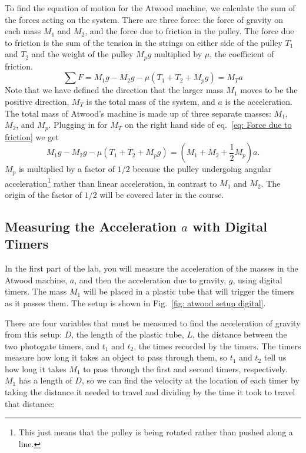 \documentclass[addpoints]{physlabs}
\begin{document}
\begin{labsection}
\begin{theory}
To find the equation of motion for the Atwood machine, we calculate the sum of the forces acting on the system. There are three force: the force of gravity on each mass $M_1$ and $M_2$, and the force due to friction in the pulley. The force due to friction is the sum of the tension in the strings on either side of the pulley $T_1$ and $T_2$ and the weight of the pulley $M_pg$ multiplied by $\mu$, the coefficient of friction.
%
\begin{equation}\label{eq: Force due to friction}
    \sum F = M_1g - M_2g - \mu(T_1 + T_2 + M_pg) = M_Ta
\end{equation}
%
Note that we have defined the direction that the larger mass $M_1$ moves to be the positive direction, $M_T$ is the total mass of the system, and $a$ is the acceleration. The total mass of Atwood's machine is made up of three separate masses: $M_1$, $M_2$, and $M_p$. Plugging in for $M_T$ on the right hand side of eq.~\ref{eq: Force due to friction} we get
%
\begin{equation}\label{eq: Force}
    M_1g - M_2g - \mu(T_1 + T_2 + M_pg) = (M_1 + M_2 + \frac{1}{2}M_p)a.
\end{equation}
%
$M_p$ is multiplied by a factor of $1/2$ because the pulley undergoing angular acceleration\footnote{This just means that the pulley is being rotated rather than pushed along a line.} rather than linear acceleration, in contrast to $M_1$ and $M_2$. The origin of the factor of $1/2$ will be covered later in the course.

\subsection*{Measuring the Acceleration $a$ with Digital Timers}

In the first part of the lab, you will measure the acceleration of the masses in the Atwood machine, $a$, and then the acceleration due to gravity, $g$, using digital timers. The mass $M_1$ will be placed in a plastic tube that will trigger the timers as it passes them. The setup is shown in Fig.~\ref{fig: atwood setup digital}.

There are four variables that must be measured to find the acceleration of gravity from this setup: $D$, the length of the plastic tube, $L$, the distance between the two photogate timers, and $t_1$ and $t_2$, the times recorded by the timers. The timers measure how long it takes an object to pass through them, so $t_1$ and $t_2$ tell us how long it takes $M_1$ to pass through the first and second timers, respectively. $M_1$ has a length of $D$, so we can find the velocity at the location of each timer by taking the distance it needed to travel and dividing by the time it took to travel that distance:


\end{theory}
\end{labsection}
\end{document}
